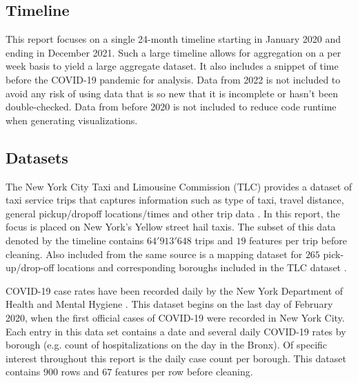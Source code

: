 \documentclass[11pt]{article}
\begin{document}
\subsection{Timeline}
This report focuses on a single 24-month timeline starting in January 2020 and ending in December 2021.
Such a large timeline allows for aggregation on a per week basis to yield a large aggregate dataset.
It also includes a snippet of time before the COVID-19 pandemic for analysis.
Data from 2022 is not included to avoid any risk of using data that is so new that it is incomplete or hasn't been double-checked.
Data from before 2020 is not included to reduce code runtime when generating visualizations.
\subsection{Datasets}
The New York City Taxi and Limousine Commission (TLC) provides a dataset of taxi service trips that captures information such as type of taxi, travel distance, general pickup/dropoff locations/times and other trip data \cite{tlcdataset}. 
In this report, the focus is placed on New York's Yellow street hail taxis.
The subset of this data denoted by the timeline contains $64'913'648$ trips and $19$ features per trip before cleaning.
Also included from the same source is a mapping dataset for $265$ pick-up/drop-off locations and corresponding boroughs included in the TLC dataset \cite{tlcdataset}.

COVID-19 case rates have been recorded daily by the New York Department of Health and Mental Hygiene \cite{coviddataset}.
This dataset begins on the last day of February 2020, when the first official cases of COVID-19 were recorded in New York City. 
Each entry in this data set contains a date and several daily COVID-19 rates by borough (e.g. count of hospitalizations on the day in the Bronx).
Of specific interest throughout this report is the daily case count per borough.
This dataset contains $900$ rows and $67$ features per row before cleaning.
\end{document}

